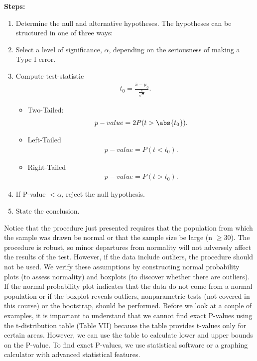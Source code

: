 \documentclass{report}
\begin{document}
    \bigbreak \noindent 
    \textbf{Steps:}
    \begin{enumerate}
        \item Determine the null and alternative hypotheses. The hypotheses can be structured in one of three ways:
        \item Select a level of significance, $\alpha$, depending on the seriousness of making a Type I error.
        \item Compute test-statistic
            \begin{align*}
                t_{0} = \frac{\overline{x}-\mu_{0}}{\frac{s}{\sqrt{n}}}
            .\end{align*}
            \begin{itemize}
                \item Two-Tailed: 
                    \begin{align*}
                        p-value = 2P(t > \abs{t_{0}})
                    .\end{align*}
                \item Left-Tailed
                    \begin{align*}
                        p-value = P(t< t_{0})
                    .\end{align*}
                \item Right-Tailed
                    \begin{align*}
                        p-value = P(t>t_{0})
                    .\end{align*}
            \end{itemize}
        \item If P-value $<\alpha$, reject the null hypothesis.
        \item State the conclusion.
    \end{enumerate}

    \bigbreak \noindent 
    Notice that the procedure just presented requires that the population from which the sample was drawn be normal or that the sample size be large (n $ \geq $30). The procedure is robust, so minor departures from normality will not adversely affect the results of the test. However, if the data include outliers, the procedure should not be used.
    \bigbreak \noindent 
    We verify these assumptions by constructing normal probability plots (to assess normality) and boxplots (to discover whether there are outliers). If the normal probability plot indicates that the data do not come from a normal population or if the boxplot reveals outliers, nonparametric tests (not covered in this course) or the bootstrap, should be performed.
    \bigbreak \noindent 
    Before we look at a couple of examples, it is important to understand that we cannot find exact P-values using the t-distribution table (Table VII) because the table provides t-values only for certain areas. However, we can use the table to calculate lower and upper bounds on the P-value. To find exact P-values, we use statistical software or a graphing calculator with advanced statistical features.
\end{document}
